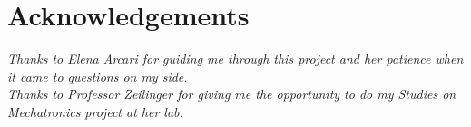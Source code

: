 \section*{Acknowledgements}
\textit{Thanks to Elena Arcari for guiding me through this project and her patience when it came to questions on my side.\\
Thanks to Professor Zeilinger for giving me the opportunity to do my Studies on Mechatronics project at her lab.}

